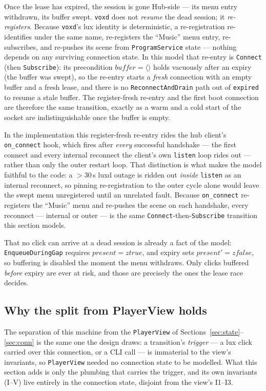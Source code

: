\documentclass[a4paper,10pt,fleqn]{article}
\begin{document}
Once the lease has expired, the session is gone Hub-side --- its menu entry
withdrawn, its buffer swept. \texttt{voxd} does not \emph{resume} the dead
session; it \emph{re-registers}. Because \texttt{voxd}'s lux identity is
deterministic, a re-registration re-identifies under the same name, re-registers
the ``Music'' menu entry, re-subscribes, and re-pushes its scene from
\texttt{ProgramService} state --- nothing depends on any surviving connection
state. In this model that re-entry is \texttt{Connect} (then \texttt{Subscribe}):
its precondition $buffer = \langle \rangle$ holds vacuously after an expiry (the
buffer was swept), so the re-entry starts a \emph{fresh} connection with an empty
buffer and a fresh lease, and there is no \texttt{ReconnectAndDrain} path out of
\texttt{expired} to resume a stale buffer. The register-fresh re-entry and the
first boot connection are therefore the same transition, exactly as a warm and a
cold start of the socket are indistinguishable once the buffer is empty.

In the implementation this register-fresh re-entry rides the hub client's
\texttt{on\_connect} hook, which fires after \emph{every} successful handshake ---
the first connect and every internal reconnect the client's own \texttt{listen}
loop rides out --- rather than only the outer restart loop. That distinction is
what makes the model faithful to the code: a $>$30\,s luxd outage is ridden out
\emph{inside} \texttt{listen} as an internal reconnect, so pinning re-registration
to the outer cycle alone would leave the swept menu unregistered until an unrelated
fault. Because \texttt{on\_connect} re-registers the ``Music'' menu and re-pushes
the scene on each handshake, every reconnect --- internal or outer --- is the same
\texttt{Connect}-then-\texttt{Subscribe} transition this section models.

That no click can arrive at a dead session is already a fact of the model:
\texttt{EnqueueDuringGap} requires $present = ztrue$, and expiry sets
$present' = zfalse$, so buffering is disabled the moment the menu withdraws.
Only clicks buffered \emph{before} expiry are ever at risk, and those are
precisely the ones the lease race decides.

\subsection{Why the split from PlayerView holds}

The separation of this machine from the \texttt{PlayerView} of
Sections~\ref{sec:state}--\ref{sec:conn} is the same one the design draws: a
transition's \emph{trigger} --- a lux click carried over this connection, or a
CLI call --- is immaterial to the view's invariants, so \texttt{PlayerView} needed
no connection state to be modelled. What this section adds is only the plumbing
that carries the trigger, and its own invariants (I--V) live entirely in the
connection state, disjoint from the view's I1--I3.
\end{document}
